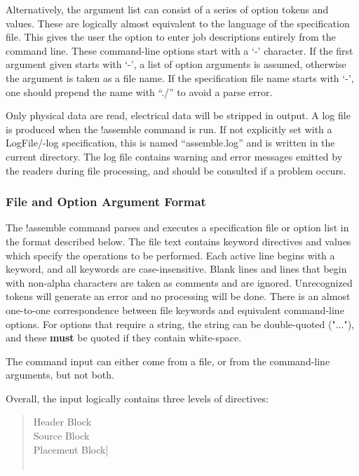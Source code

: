 Alternatively, the argument list can consist of a series of option
tokens and values.  These are logically almost equivalent to the
language of the specification file.  This gives the user the option to
enter job descriptions entirely from the command line.  These
command-line options start with a `{\vt -}' character.  If the first
argument given starts with `{\vt -}', a list of option arguments is
assumed, otherwise the argument is taken as a file name.  If the
specification file name starts with `{\vt -}', one should prepend the
name with ``{\vt ./}'' to avoid a parse error.

Only physical data are read, electrical data will be stripped in
output.  A log file is produced when the {\cb !assemble} command is
run.  If not explicitly set with a {\vt LogFile}/{\vt -log}
specification, this is named ``{\vt assemble.log}'' and is written in
the current directory.  The log file contains warning and error
messages emitted by the readers during file processing, and should be
consulted if a problem occurs.

\subsubsection{File and Option Argument Format}

The {\cb !assemble} command parses and executes a specification file
or option list in the format described below.  The file text contains
keyword directives and values which specify the operations to be
performed.  Each active line begins with a keyword, and all keywords
are case-insensitive.  Blank lines and lines that begin with non-alpha
characters are taken as comments and are ignored.  Unrecognized tokens
will generate an error and no processing will be done.  There is an
almost one-to-one correspondence between file keywords and equivalent
command-line options.  For options that require a string, the string
can be double-quoted ({\vt "..."}), and these {\bf must} be quoted if
they contain white-space.

The command input can either come from a file, or from the
command-line arguments, but not both.

Overall, the input logically contains three levels of directives:

\begin{quote}
Header Block\\
Source Block\\
\hspace*{3em}{\vt [}Placement Block{\vt ]}\\
\hspace*{3em}{\vt [...]}\\
{\vt [...]}
\end{quote}


